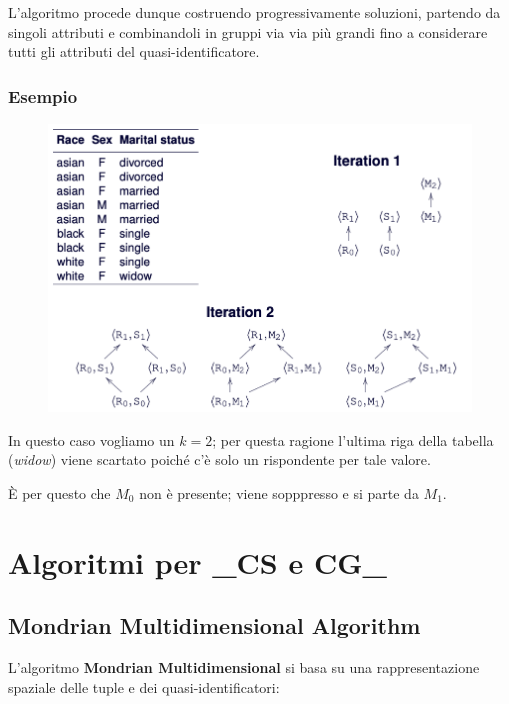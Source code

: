 \documentclass{report}
\begin{document}
\noindent L'algoritmo procede dunque costruendo progressivamente soluzioni, partendo da singoli attributi e combinandoli in gruppi via via più grandi fino a considerare tutti gli attributi del quasi-identificatore.

\newpage
\subsubsection{Esempio}
\begin{figure}[ht]
    \centering
    \includegraphics[width=1\linewidth]{images/incognito.png}
\end{figure}
In questo caso vogliamo un $k=2$; per questa ragione l'ultima riga della tabella 
(\textit{widow}) viene scartato poiché c'è solo un rispondente per tale valore.

È per questo che $M_0$ non è presente; viene sopppresso e si parte da $M_1$.


\newpage
\section{Algoritmi per \_CS e CG\_}

\subsection{Mondrian Multidimensional Algorithm}
L'algoritmo \textbf{Mondrian Multidimensional} si basa su una rappresentazione spaziale delle tuple e dei quasi-identificatori:
\end{document}

